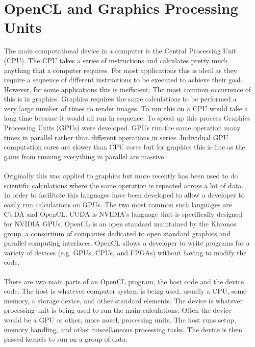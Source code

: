 \documentclass[10pt,a4paper,titlepage]{report}
\begin{document}
\section{OpenCL and Graphics Processing Units}
The main computational device in a computer is the Central Processing Unit (CPU). The CPU takes a series of instructions and calculates pretty much anything that a computer requires. For most applications this is ideal as they require a sequence of different instructions to be executed to achieve their goal. However, for some applications this is inefficient. The most common occurrence of this is in graphics. Graphics requires the same calculations to be performed a very large number of times to render images. To run this on a CPU would take a long time because it would all run in sequence. To speed up this process Graphics Processing Units (GPUs) were developed. GPUs run the same operation many times in parallel rather than different operations in series. Individual GPU computation cores are slower than CPU cores but for graphics this is fine as the gains from running everything in parallel are massive.
\\\\Originally this was applied to graphics but more recently has been used to do scientific calculations where the same operation is repeated across a lot of data. In order to facilitate this languages have been developed to allow a developer to easily run calculations on GPUs. The two most common such languages are CUDA and OpenCL. CUDA is NVIDIA's language that is specifically designed for NVIDIA GPUs. OpenCL is an open standard maintained by the Khronos group, a consortium of companies dedicated to open standard graphics and parallel computing interfaces. OpenCL allows a developer to write programs for a variety of devices (e.g. GPUs, CPUs, and FPGAs) without having to modify the code.
\\\\There are two main parts of an OpenCL program, the host code and the device code. The host is whatever computer system is being used, usually a CPU, some memory, a storage device, and other standard elements. The device is whatever processing unit is being used to run the main calculations. Often the device would be a GPU or other, more novel, processing units. The host runs setup, memory handling, and other miscellaneous processing tasks. The device is then passed kernels to run on a group of data.
\end{document}
